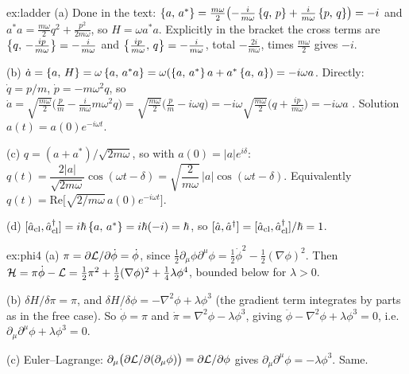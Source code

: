 \documentclass[11pt]{article}
\begin{document}
\begin{solution}{ex:ladder}
(a) Done in the text: $\left\{a,\,a^*\right\}=\frac{m\omega}2\bigl(-\frac i{m\omega}\left\{q,\,p\right\}+\frac i{m\omega}\left\{p,\,q\right\}\bigr)=-i$ and $a^*a=\frac{m\omega}2q^2+\frac{p^2}{2m\omega}$, so $H=\omega a^*a$. Explicitly in the bracket the cross terms are $\left\{q,\,-\frac{ip}{m\omega}\right\}=-\frac i{m\omega}$ and $\left\{\frac{ip}{m\omega},\,q\right\}=-\frac i{m\omega}$, total $-\frac{2i}{m\omega}$, times $\frac{m\omega}2$ gives $-i$.

(b) $\dot a=\left\{a,\,H\right\}=\omega\left\{a,\,a^*a\right\}=\omega(\left\{a,\,a^*\right\}a+a^*\left\{a,\,a\right\})=-i\omega a$. Directly: $\dot q=p/m$, $\dot p=-m\omega^2q$, so $\dot a=\sqrt{\tfrac{m\omega}2}\bigl(\tfrac pm-\tfrac{i}{m\omega}m\omega^2q\bigr)=\sqrt{\tfrac{m\omega}2}\bigl(\tfrac pm-i\omega q\bigr)=-i\omega\sqrt{\tfrac{m\omega}2}\bigl(q+\tfrac{ip}{m\omega}\bigr)=-i\omega a$ \checkmark. Solution $a(t)=a(0)e^{-i\omega t}$.

(c) $q=(a+a^*)/\sqrt{2m\omega}$, so with $a(0)=|a|e^{i\delta}$: $q(t)=\dfrac{2|a|}{\sqrt{2m\omega}}\cos(\omega t-\delta)=\sqrt{\dfrac2{m\omega}}\,|a|\cos(\omega t-\delta)$. Equivalently $q(t)=\mathrm{Re}\bigl[\sqrt{2/m\omega}\,a(0)e^{-i\omega t}\bigr]$.

(d) $[\hat a_{\rm cl},\hat a^\dagger_{\rm cl}]=i\hbar\left\{a,\,a^*\right\}=i\hbar(-i)=\hbar$, so $[\hat a,\hat a^\dagger]=[\hat a_{\rm cl},\hat a_{\rm cl}^\dagger]/\hbar=1$.
\end{solution}

\begin{solution}{ex:phi4}
(a) $\pi=\partial\mathcal{L}/\partial\dot\phi=\dot\phi$, since $\tfrac12\partial_\mu\phi\partial^\mu\phi=\tfrac12\dot\phi^2-\tfrac12(\nabla\phi)^2$. Then $\mathcal{H}=\pi\dot\phi-\mathcal{L}=\tfrac12\pi^2+\tfrac12(\nabla\phi)^2+\tfrac14\lambda\phi^4$, bounded below for $\lambda>0$.

(b) $\delta H/\delta\pi=\pi$, and $\delta H/\delta\phi=-\nabla^2\phi+\lambda\phi^3$ (the gradient term integrates by parts as in the free case). So $\dot\phi=\pi$ and $\dot\pi=\nabla^2\phi-\lambda\phi^3$, giving $\ddot\phi-\nabla^2\phi+\lambda\phi^3=0$, i.e.\ $\partial_\mu\partial^\mu\phi+\lambda\phi^3=0$.

(c) Euler--Lagrange: $\partial_\mu\bigl(\partial\mathcal{L}/\partial(\partial_\mu\phi)\bigr)=\partial\mathcal{L}/\partial\phi$ gives $\partial_\mu\partial^\mu\phi=-\lambda\phi^3$. Same. \checkmark
\end{solution}
\end{document}
